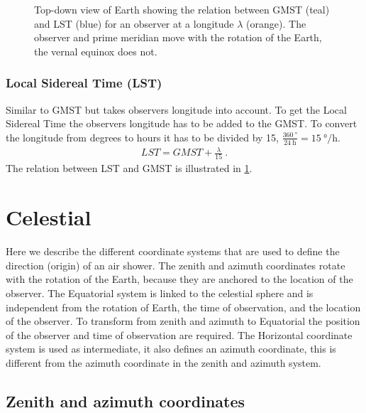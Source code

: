 \begin{figure}
    \centering
    
    \caption{Top-down view of Earth showing the relation between GMST
             (teal) and LST (blue) for an observer at a longitude
             $\lambda$ (orange). The observer and prime meridian move with
             the rotation of the Earth, the vernal equinox does not.}
    \label{fig:wgs84_gmst_lst}
\end{figure}


\subsubsection{Local Sidereal Time (LST)}

Similar to GMST but takes observers longitude into account. To get the
Local Sidereal Time the observers longitude has to be added to the GMST.
To convert the longitude from degrees to hours it has to be divided by
15, $\frac{\SI{360}{\degree}}{\SI{24}{\hour}} =
\SI{15}{\degree\per\hour}$.
%
\begin{equation}
    \begin{array}{l}
        \mathit{LST} = \mathit{GMST} + \frac{\lambda}{15} \ .
    \end{array}
\end{equation}
%
The relation between LST and GMST is illustrated in
\cref{fig:wgs84_gmst_lst}.


\section{Celestial}
\label{sec:celestial}

Here we describe the different coordinate systems that are used to
define the direction (origin) of an air shower. The zenith and azimuth
coordinates rotate with the rotation of the Earth, because they are
anchored to the location of the observer. The Equatorial system is
linked to the celestial sphere and is independent from the rotation of
Earth, the time of observation, and the location of the observer. To
transform from zenith and azimuth to Equatorial the position of the
observer and time of observation are required. The Horizontal coordinate
system is used as intermediate, it also defines an azimuth coordinate,
this is different from the azimuth coordinate in the zenith and azimuth
system.


\subsection{Zenith and azimuth coordinates}

